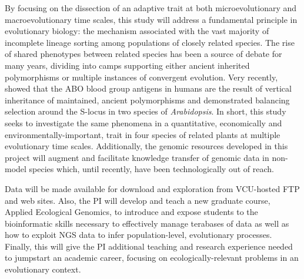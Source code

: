 By focusing on the dissection of an adaptive trait at both microevolutionary and macroevolutionary 
time scales, this study will address a fundamental principle in evolutionary biology: the mechanism 
associated with the vast majority of incomplete lineage sorting among populations of closely related species.  
The rise of shared phenotypes between related species has been a source of debate for many years, dividing 
into camps supporting either ancient inherited polymorphisms or multiple instances of convergent evolution.  Very recently, 
\citet{Segurel:vf} showed that the ABO blood group antigens in humans are the result of vertical inheritance 
of maintained, ancient polymorphisms and \citet{Roux:2012eb} demonstrated balancing selection around the S-locus in two 
species of  \emph{Arabidopsis}.  
In short, this study seeks to investigate the same phenomena in a quantitative, economically and 
environmentally-important, trait in four species of related plants at multiple evolutionary time scales.  Additionally, 
the genomic resources developed in this project will augment and facilitate knowledge transfer of genomic data in non-model 
species which, until recently, have been technologically out of reach.



Data will be made available for download and exploration from VCU-hosted FTP and web sites.  Also, the PI will develop and teach a new 
graduate course, Applied Ecological Genomics, to introduce and expose students to the bioinformatic skills necessary 
to effectively manage terabases of data as well as how to exploit NGS data to infer population-level, evolutionary processes.   
Finally, this will give the PI additional teaching and research experience needed to jumpstart an academic career, focusing on 
ecologically-relevant problems in an evolutionary context.

